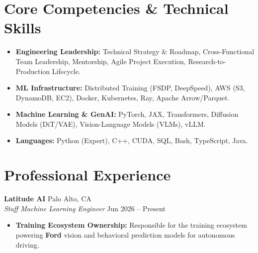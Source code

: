 \documentclass[10pt,letterpaper]{article}
\begin{document}
\section{Core Competencies \& Technical Skills}
\begin{itemize}
    \item \textbf{Engineering Leadership:} Technical Strategy \& Roadmap, Cross-Functional Team Leadership, Mentorship, Agile Project Execution, Research-to-Production Lifecycle.
    \item \textbf{ML Infrastructure:} Distributed Training (FSDP, DeepSpeed), AWS (S3, DynamoDB, EC2), Docker, Kubernetes, Ray, Apache Arrow/Parquet.
    \item \textbf{Machine Learning \& GenAI:} PyTorch, JAX, Transformers, Diffusion Models (DiT/VAE), Vision-Language Models (VLMs), vLLM.
    \item \textbf{Languages:} Python (Expert), C++, CUDA, SQL, Bash, TypeScript, Java.
\end{itemize}

\section{Professional Experience}

\textbf{Latitude AI} \hfill Palo Alto, CA \\
\textit{Staff Machine Learning Engineer} \hfill Jun 2026 -- Present
\begin{itemize}
    \item \textbf{Training Ecosystem Ownership:} Responsible for the training ecosystem powering \textbf{Ford} vision and behavioral prediction models for autonomous driving.
\end{itemize}
\end{document}
